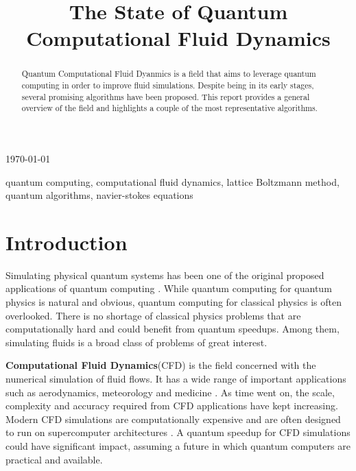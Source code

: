 \documentclass[conference]{IEEEtran}
\begin{document}
\title{The State of Quantum Computational Fluid Dynamics}


\author{
}

\maketitle
\thispagestyle{fancy}

\today

\begin{abstract}
Quantum Computational Fluid Dyanmics is a field that aims to leverage quantum computing in order to improve fluid simulations. Despite being in its early stages, several promising algorithms have been proposed. This report provides a general overview of the field and highlights a couple of the most representative algorithms.
\end{abstract}

\begin{IEEEkeywords}
    quantum computing, computational fluid dynamics, lattice Boltzmann method, quantum algorithms, navier-stokes equations
\end{IEEEkeywords}

\section{Introduction}
Simulating physical quantum systems has been one of the original proposed applications of quantum computing \cite{feynman2018simulating}.
While quantum computing for quantum physics is natural and obvious, quantum computing for classical physics is often overlooked.
There is no shortage of classical physics problems that are computationally hard and could benefit from quantum speedups. 
Among them, simulating fluids is a broad class of problems of great interest.

\textbf{Computational Fluid Dynamics}(CFD) is the field concerned with the numerical simulation of fluid flows.
It has a wide range of important applications such as aerodynamics, meteorology and medicine \cite{blazek2015computational}.
As time went on, the scale, complexity and accuracy required from CFD applications have kept increasing.
Modern CFD simulations are computationally expensive and are often designed to run on supercomputer architectures \cite{karp2024experience}.
A quantum speedup for CFD simulations could have significant impact, assuming a future in which quantum computers are practical and available.
\end{document}
